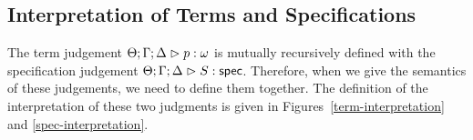 % 
% 
% 
% 
% 

\subsection{Interpretation of Terms and Specifications}

The term judgement ${\Theta; \Gamma; \Delta} \vartriangleright {p} : {\omega}$ is mutually recursively
defined with the specification judgement ${\Theta; \Gamma; \Delta} \vartriangleright {S} : \mathsf{spec}$. Therefore, when
we give the semantics of these judgements, we need to define them
together. The definition of the interpretation of these two judgments
is given in Figures~\ref{term-interpretation} and
\ref{spec-interpretation}.

